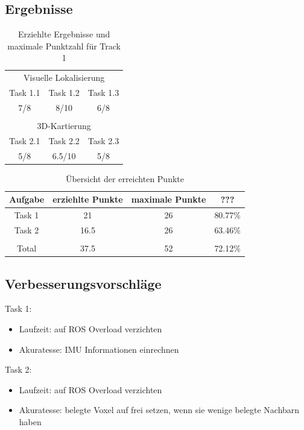 \documentclass[12pt,titlepage, a4paper]{article}
\begin{document}
\subsection{Ergebnisse}
\FloatBarrier
\begin{table}[h!]
\centering
\begin{tabular}{c|c|c}
\multicolumn{3}{c}{Visuelle Lokalisierung}\vspace{2mm}\\
Task 1.1 & Task 1.2 & Task 1.3\\
\hline\vspace{2mm}
7/8 & 8/10 & 6/8\\
\multicolumn{3}{c}{ }\\
\multicolumn{3}{c}{3D-Kartierung}\vspace{2mm}\\
Task 2.1 & Task 2.2 & Task 2.3\\
\hline\vspace{2mm}
5/8 & 6.5/10 & 5/8\\
\end{tabular}
\caption{Erziehlte Ergebnisse und maximale Punktzahl für Track 1}
\label{table:finalscore1}
\end{table}

\begin{table}[h!]
\centering
\begin{tabular}{c|c|c|c}
Aufgabe & erziehlte Punkte & maximale Punkte & ???\\
\hline
Task 1 & 21 & 26 & 80.77\% \\
Task 2 & 16.5 & 26 & 63.46\% \\
\hline
\hline
 & & \\
Total & 37.5 & 52 & 72.12\%\\
\end{tabular}
\caption{Übersicht der erreichten Punkte}
\label{table:finalscore2}
\end{table}

\FloatBarrier

\subsection{Verbesserungsvorschläge}

Task 1:
\begin{itemize}
	\item{Laufzeit: auf ROS Overload verzichten}
	\item{Akuratesse: IMU Informationen einrechnen}
\end{itemize}

Task 2:
\begin{itemize}
	\item{Laufzeit: auf ROS Overload verzichten}
	\item{Akuratesse: belegte Voxel auf frei setzen, wenn sie wenige belegte Nachbarn haben}
\end{itemize}




\end{document}
